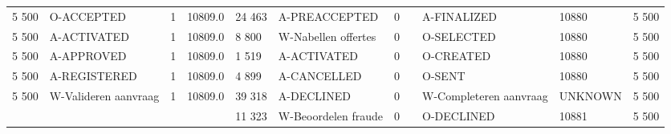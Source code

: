 \begin{tabular}{lllllllllll}
5 500 & O-ACCEPTED & 1 & 10809.0 & 24 463 & A-PREACCEPTED & 0 &  & A-FINALIZED & 10880 & 5 500 \\
5 500 & A-ACTIVATED & 1 & 10809.0 & 8 800 & W-Nabellen offertes & 0 &  & O-SELECTED & 10880 & 5 500 \\
5 500 & A-APPROVED & 1 & 10809.0 & 1 519 & A-ACTIVATED & 0 &  & O-CREATED & 10880 & 5 500 \\
5 500 & A-REGISTERED & 1 & 10809.0 & 4 899 & A-CANCELLED & 0 &  & O-SENT & 10880 & 5 500 \\
5 500 & W-Valideren aanvraag & 1 & 10809.0 & 39 318 & A-DECLINED & 0 &  & W-Completeren aanvraag & UNKNOWN & 5 500 \\
 &  &  &  & 11 323 & W-Beoordelen fraude & 0 &  & O-DECLINED & 10881 & 5 500 \\
\bottomrule
\end{tabular}
